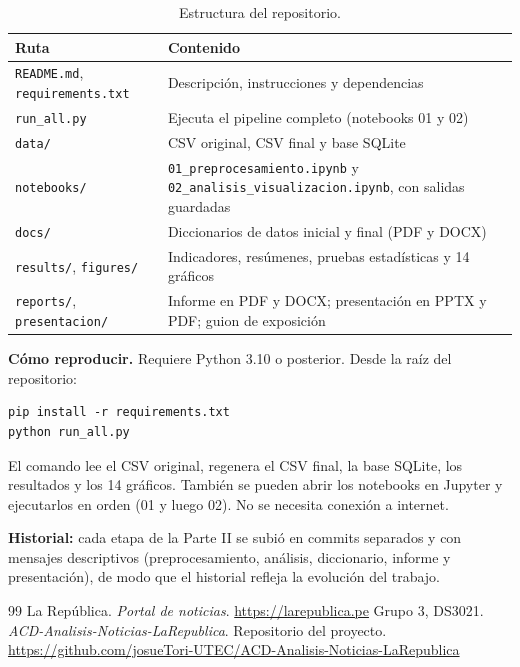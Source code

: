 \documentclass[12pt,a4paper]{article}
\begin{document}
\begin{table}[H]\centering
\caption{Estructura del repositorio.}
\begin{tabular}{p{4.6cm}p{10cm}}
\toprule
\textbf{Ruta} & \textbf{Contenido}\\\midrule
\texttt{README.md}, \texttt{requirements.txt} & Descripción, instrucciones y dependencias\\
\texttt{run\_all.py} & Ejecuta el pipeline completo (notebooks 01 y 02)\\
\texttt{data/} & CSV original, CSV final y base SQLite\\
\texttt{notebooks/} & \texttt{01\_preprocesamiento.ipynb} y \texttt{02\_analisis\_visualizacion.ipynb}, con salidas guardadas\\
\texttt{docs/} & Diccionarios de datos inicial y final (PDF y DOCX)\\
\texttt{results/}, \texttt{figures/} & Indicadores, resúmenes, pruebas estadísticas y 14 gráficos\\
\texttt{reports/}, \texttt{presentacion/} & Informe en PDF y DOCX; presentación en PPTX y PDF; guion de exposición\\
\bottomrule
\end{tabular}
\end{table}

\textbf{Cómo reproducir.} Requiere Python 3.10 o posterior. Desde la raíz del repositorio:
\begin{lstlisting}
pip install -r requirements.txt
python run_all.py
\end{lstlisting}
El comando lee el CSV original, regenera el CSV final, la base SQLite, los resultados y los 14 gráficos. También se pueden abrir los notebooks en Jupyter y ejecutarlos en orden (01 y luego 02). No se necesita conexión a internet.

\textbf{Historial:} cada etapa de la Parte II se subió en commits separados y con mensajes descriptivos (preprocesamiento, análisis, diccionario, informe y presentación), de modo que el historial refleja la evolución del trabajo.

\begin{thebibliography}{99}
 La República. \textit{Portal de noticias}. \url{https://larepublica.pe}
 Grupo 3, DS3021. \textit{ACD-Analisis-Noticias-LaRepublica}. Repositorio del proyecto. \url{https://github.com/josueTori-UTEC/ACD-Analisis-Noticias-LaRepublica}
\end{thebibliography}
\end{document}
